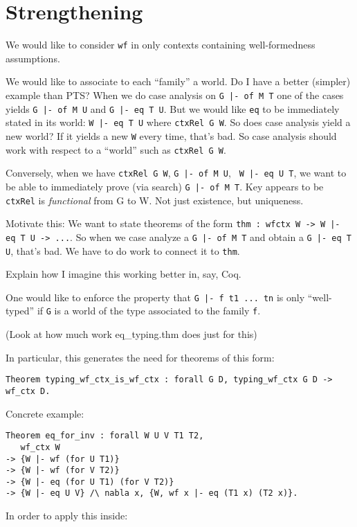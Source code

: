 \documentclass{article}
\begin{document}
\section{Strengthening}
We would like to consider {\tt wf} in only
contexts containing well-formedness assumptions.

We would like to associate to each ``family'' a world.
Do I have a better (simpler) example than PTS?
When we do case analysis on {\tt {G |- of M T}} one of the cases yields
{\tt {G |- of M U}} and {\tt {G |- eq T U}}. But we would like {\tt eq}
  to be immediately stated in its world: {\tt {W |- eq T U}} where
  {\tt ctxRel G W}. So does case analysis yield a new world? If it
  yields a new {\tt W} every time, that's bad. So case analysis should
  work with respect to a ``world'' such as {\tt ctxRel G W}.

Conversely, when we have {\tt ctxRel G W}, {\tt {G |- of M U}}, {\tt
  {W |- eq U T}}, we want to be able to immediately prove (via search)
{\tt {G |- of M T}}. Key appears to be {\tt ctxRel} is
\emph{functional} from G to W. Not just existence, but uniqueness.

Motivate this: We want to state theorems of the form {\tt thm : wfctx W ->
  {W |- eq T U} -> ...}. So when we case analyze a {\tt {G |- of M T}}
and obtain a {\tt {G |- eq T U}}, that's bad. We have to do work to
connect it to {\tt thm}.

Explain how I imagine this working better in, say, Coq.

One would like to enforce the property that {\tt {G |- f t1 ... tn}} is
only ``well-typed'' if {\tt G} is a world of the type associated to
the family {\tt f}. 

(Look at how much work eq\_typing.thm does just for this)

In particular, this generates the need for theorems of this form:

\begin{verbatim}
Theorem typing_wf_ctx_is_wf_ctx : forall G D, typing_wf_ctx G D -> wf_ctx D.
\end{verbatim}

Concrete example: 
\begin{verbatim}
Theorem eq_for_inv : forall W U V T1 T2,
   wf_ctx W
-> {W |- wf (for U T1)}
-> {W |- wf (for V T2)}
-> {W |- eq (for U T1) (for V T2)}
-> {W |- eq U V} /\ nabla x, {W, wf x |- eq (T1 x) (T2 x)}.
\end{verbatim}

In order to apply this inside:
\end{document}
